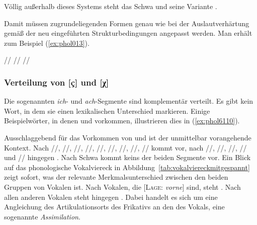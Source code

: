 
Völlig außerhalb dieses Systems steht das Schwa und seine Variante \textipa{[5]}.


Damit müssen zugrundeliegenden Formen genau wie bei der Auslautverhärtung gemäß der neu eingeführten Strukturbedingungen angepasst werden.
Man erhält zum Beispiel (\ref{ex:phol013}).

\begin{exe}
  \ex\label{ex:phol013} \begin{xlist}
  	\ex // \phopro \textipa{[ve:g]}
  	\ex // \phopro \textipa{[h\o:l@]} 
  	\ex // \phopro \textipa{[o:f@n]}
  \end{xlist}
\end{exe}


\subsubsection{Verteilung von [ç] und [χ]}

\label{sec:prozichach}

Die sogenannten \textit{ich}- und \textit{ach}-Segmente sind komplementär verteilt.
Es gibt kein Wort, in dem sie einen lexikalischen Unterschied markieren.
Einige Beispielwörter, in denen \textipa{[\c{c}]} und \textipa{[X]} vorkommen, illustrieren dies in (\ref{ex:phol6110}).

\begin{exe}
  \ex\label{ex:phol6110}
  \begin{xlist}
  \end{xlist}
\end{exe}

Ausschlaggebend für das Vorkommen von \textipa{[\c{c}]} und \textipa{[X]} ist der unmittelbar vorangehende Kontext.
Nach //, //, //, //, //, /\textipa{\o}/, //, //, /\textipa{\oe}/ kommt \textipa{[\c{c}]} vor, nach //, //, //, // und // hingegen \textipa{[X]}.
Nach Schwa kommt keins der beiden Segmente vor.
Ein Blick auf das phonologische Vokalviereck in Abbildung~\ref{tab:vokalviereckmitgespannt} zeigt sofort, was der relevante Merkmalsunterschied zwischen den beiden Gruppen von Vokalen ist.
Nach Vokalen, die [\textsc{Lage}: \textit{vorne}] sind, steht \textipa{[\c{c}]}.
Nach allen anderen Vokalen steht hingegen \textipa{[X]}.
Dabei handelt es sich um eine Angleichung des Artikulationsorts des Frikativs an den des Vokals, eine sogenannte \textit{Assimilation}.

